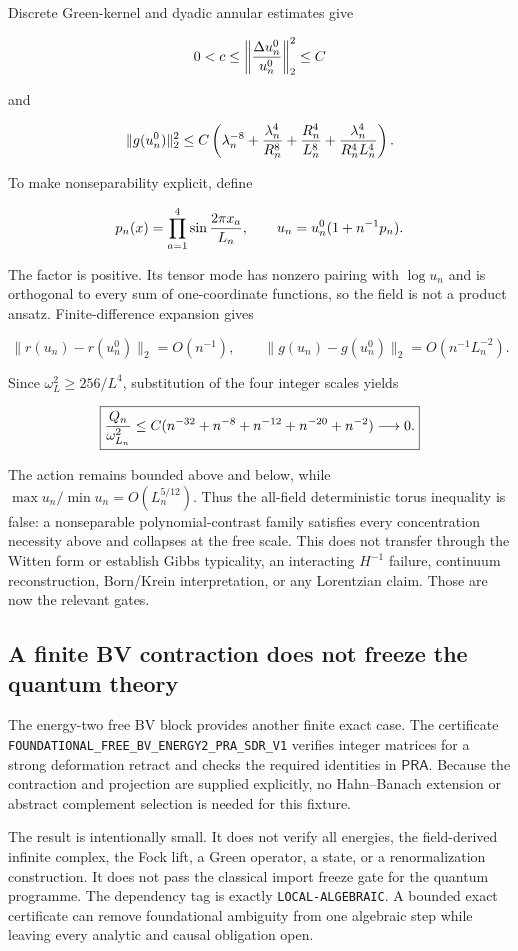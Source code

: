 \documentclass[11pt]{article}
\theoremstyle{definition}
\theoremstyle{remark}
\newcommand{\PRA}{\mathsf{PRA}}
\newcommand{\cert}[1]{\nolinkurl{#1}}
\newcommand{\rtype}[1]{\nolinkurl{#1}}
\begin{document}
Discrete Green-kernel and dyadic annular estimates give

\[
 0<c\leq\left\|{\Delta u_n^0\over u_n^0}\right\|_2^2\leq C
\]

and

\[
 \lVert g(u_n^0)\rVert_2^2\leq C\left(
 \lambda_n^{-8}+{\lambda_n^4\over R_n^8}
 +{R_n^4\over L_n^8}
 +{\lambda_n^4\over R_n^4L_n^4}\right).
\]

To make nonseparability explicit, define

\[
 p_n(x)=\prod_{a=1}^4\sin{2\pi x_a\over L_n},\qquad
 u_n=u_n^0(1+n^{-1}p_n).
\]

The factor is positive.  Its tensor mode has nonzero pairing with
\(\log u_n\) and is orthogonal to every sum of one-coordinate functions, so
the field is not a product ansatz.  Finite-difference expansion gives

\[
 \lVert r(u_n)-r(u_n^0)\rVert_2=O(n^{-1}),\qquad
 \lVert g(u_n)-g(u_n^0)\rVert_2=O(n^{-1}L_n^{-2}).
\]

Since \(\omega_L^2\geq256/L^4\), substitution of the four integer scales
yields

\[
 \boxed{{Q_n\over\omega_{L_n}^2}
 \leq C(n^{-32}+n^{-8}+n^{-12}+n^{-20}+n^{-2})
 \longrightarrow0.}
\]

The action remains bounded above and below, while
\(\max u_n/\min u_n=O(L_n^{5/12})\).  Thus the all-field deterministic
torus inequality is false: a nonseparable polynomial-contrast family
satisfies every concentration necessity above and collapses at the free
scale.  This does not transfer through the Witten form or establish Gibbs
typicality, an interacting \(H^{-1}\) failure, continuum reconstruction,
Born/Krein interpretation, or any Lorentzian claim.  Those are now the
relevant gates.
\fi

\subsection{A finite BV contraction does not freeze the quantum theory}

The energy-two free BV block provides another finite exact case.  The
certificate \cert{FOUNDATIONAL_FREE_BV_ENERGY2_PRA_SDR_V1} verifies integer
matrices for a strong deformation retract and checks the required identities
in \(\PRA\).  Because the contraction and projection are supplied explicitly,
no Hahn--Banach extension or abstract complement selection is needed for this
fixture.

The result is intentionally small.  It does not verify all energies, the
field-derived infinite complex, the Fock lift, a Green operator, a state, or a
renormalization construction.  It does not pass the classical import freeze
gate for the quantum programme.  The dependency tag is exactly
\rtype{LOCAL-ALGEBRAIC}.  A bounded exact certificate can remove foundational
ambiguity from one algebraic step while leaving every analytic and causal
obligation open.
\end{document}
